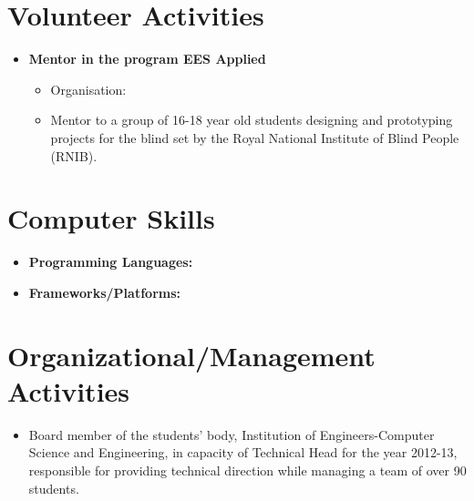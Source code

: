 \documentclass[10pt]{article}
\begin{document}
\section*{Volunteer Activities}
\begin{itemize}
	\item\bf{Mentor in the program EES Applied}
	\begin{itemize}
		\item[] Organisation: 
		\item[] Mentor to a group of 16-18 year old students designing and prototyping projects for the blind set by the Royal National Institute of Blind People (RNIB).
	\end{itemize}
\end{itemize}

\section*{Computer Skills}
\begin{itemize}
    \item \bf{Programming Languages}: 
    \item \bf{Frameworks/Platforms}: 
\end{itemize}

\section*{Organizational/Management Activities}
\begin{itemize}
	\item[] Board member of the students’ body, Institution of Engineers-Computer Science and Engineering, in capacity of Technical Head for the year 2012-13, responsible for providing technical direction while managing a team of over 90 students.
\end{itemize}
\end{document}
